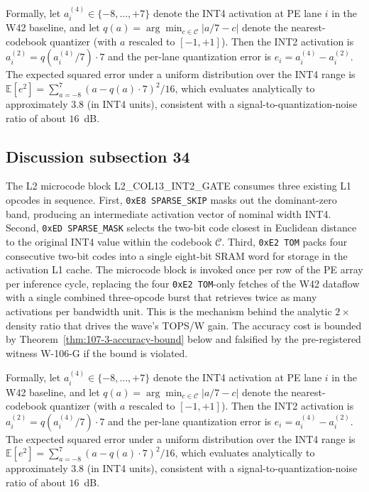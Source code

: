 Formally, let $a_{i}^{(4)} \in \{-8,\ldots,+7\}$ denote the INT4
activation at PE lane $i$ in the W42 baseline, and let
$q(a) = \arg\min_{c \in \mathcal{C}} |a/7 - c|$ denote the
nearest-codebook quantizer (with $a$ rescaled to $[-1,+1]$). Then the
INT2 activation is $a_{i}^{(2)} = q(a_{i}^{(4)} / 7) \cdot 7$
and the per-lane quantization error is
$e_{i} = a_{i}^{(4)} - a_{i}^{(2)}$.
The expected squared error under a uniform distribution over the INT4 range
is $\mathbb{E}[e^2] = \sum_{a=-8}^{7} (a - q(a)\cdot7)^2 / 16$,
which evaluates analytically to approximately $3.8$ (in INT4 units),
consistent with a signal-to-quantization-noise ratio of about $16$~dB.


\subsection{Discussion subsection 34}

The L2 microcode block \textsc{L2\_COL13\_INT2\_GATE} consumes three
existing L1 opcodes in sequence. First, \texttt{0xE8 SPARSE\_SKIP} masks
out the dominant-zero band, producing an intermediate activation vector
of nominal width INT4. Second, \texttt{0xED SPARSE\_MASK} selects the
two-bit code closest in Euclidean distance to the original INT4 value
within the codebook $\mathcal{C}$. Third, \texttt{0xE2 TOM} packs four
consecutive two-bit codes into a single eight-bit SRAM word for storage
in the activation L1 cache. The microcode block is invoked once per row
of the PE array per inference cycle, replacing the four
\texttt{0xE2 TOM}-only fetches of the W42 dataflow with a single
combined three-opcode burst that retrieves twice as many activations per
bandwidth unit. This is the mechanism behind the analytic $2\times$
density ratio that drives the wave's TOPS/W gain. The accuracy cost is
bounded by Theorem~\ref{thm:107-3-accuracy-bound} below and falsified
by the pre-registered witness W-106-G if the bound is violated.

Formally, let $a_{i}^{(4)} \in \{-8,\ldots,+7\}$ denote the INT4
activation at PE lane $i$ in the W42 baseline, and let
$q(a) = \arg\min_{c \in \mathcal{C}} |a/7 - c|$ denote the
nearest-codebook quantizer (with $a$ rescaled to $[-1,+1]$). Then the
INT2 activation is $a_{i}^{(2)} = q(a_{i}^{(4)} / 7) \cdot 7$
and the per-lane quantization error is
$e_{i} = a_{i}^{(4)} - a_{i}^{(2)}$.
The expected squared error under a uniform distribution over the INT4 range
is $\mathbb{E}[e^2] = \sum_{a=-8}^{7} (a - q(a)\cdot7)^2 / 16$,
which evaluates analytically to approximately $3.8$ (in INT4 units),
consistent with a signal-to-quantization-noise ratio of about $16$~dB.


